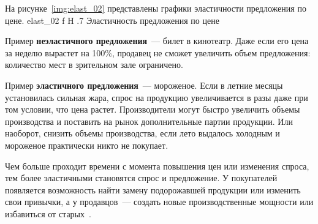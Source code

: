 На рисунке~\ref{img:elast_02} представлены графики эластичности предложения по цене.
{elast_02}
{f}
{H}
{.7\textwidth}
{Эластичность предложения по цене~\cite{elast1}}

Пример \textbf{неэластичного предложения}~--- билет в кинотеатр. 
Даже если его цена за неделю вырастет на 100\%, продавец не сможет увеличить объем предложения: количество мест в зрительном зале ограничено.

Пример \textbf{эластичного предложения}~--- мороженое. 
Если в летние месяцы установилась сильная жара, спрос на продукцию увеличивается в разы даже при том условии, что цена растет. 
Производители могут быстро увеличить объемы производства и поставить на рынок дополнительные партии продукции. 
Или наоборот, снизить объемы производства, если лето выдалось холодным и мороженое практически никто не покупает.

Чем больше проходит времени с момента повышения цен или изменения спроса, тем более эластичными становятся спрос и предложение. 
У покупателей появляется возможность найти замену подорожавшей продукции или изменить свои привычки, а у продавцов~--- создать новые производственные мощности или избавиться от старых~\cite{elast1}.